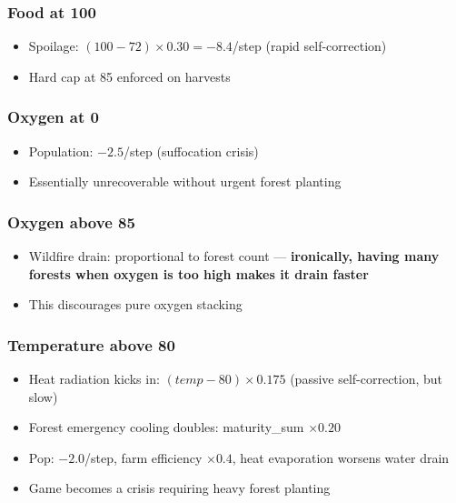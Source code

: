 \documentclass[12pt,a4paper]{article}
\begin{document}
\subsubsection*{Food at 100}
\begin{itemize}[leftmargin=1.5cm]
    \item Spoilage: $(100 - 72) \times 0.30 = -8.4$/step (rapid self-correction)
    \item Hard cap at 85 enforced on harvests
\end{itemize}

\subsubsection*{Oxygen at 0}
\begin{itemize}[leftmargin=1.5cm]
    \item Population: $-2.5$/step (suffocation crisis)
    \item Essentially unrecoverable without urgent forest planting
\end{itemize}

\subsubsection*{Oxygen above 85}
\begin{itemize}[leftmargin=1.5cm]
    \item Wildfire drain: proportional to forest count --- \textbf{ironically, having many forests when oxygen is too high makes it drain faster}
    \item This discourages pure oxygen stacking
\end{itemize}

\subsubsection*{Temperature above 80}
\begin{itemize}[leftmargin=1.5cm]
    \item Heat radiation kicks in: $(temp - 80) \times 0.175$ (passive self-correction, but slow)
    \item Forest emergency cooling doubles: maturity\_sum $\times 0.20$
    \item Pop: $-2.0$/step, farm efficiency $\times 0.4$, heat evaporation worsens water drain
    \item Game becomes a crisis requiring heavy forest planting
\end{itemize}
\end{document}

